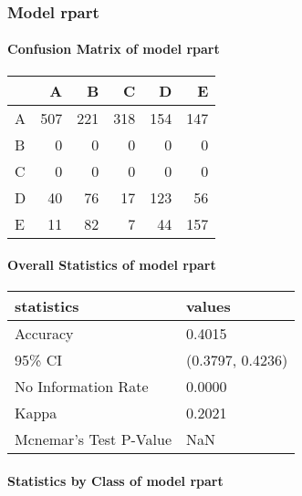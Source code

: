 \documentclass[]{article}
\let\oldparagraph\paragraph
\renewcommand{\paragraph}[1]{\oldparagraph{#1}\mbox{}}
\begin{document}
\subsubsection{Model rpart}\label{model-rpart}

\paragraph{Confusion Matrix of model
rpart}\label{confusion-matrix-of-model-rpart}

\begin{table}[H]
\centering
\begin{tabular}{l|r|r|r|r|r}
\hline
  & A & B & C & D & E\\
\hline
A & 507 & 221 & 318 & 154 & 147\\
\hline
B & 0 & 0 & 0 & 0 & 0\\
\hline
C & 0 & 0 & 0 & 0 & 0\\
\hline
D & 40 & 76 & 17 & 123 & 56\\
\hline
E & 11 & 82 & 7 & 44 & 157\\
\hline
\end{tabular}
\end{table}

\paragraph{Overall Statistics of model
rpart}\label{overall-statistics-of-model-rpart}

\begin{table}[H]
\centering
\begin{tabular}{l|l}
\hline
statistics & values\\
\hline
Accuracy & 0.4015\\
\hline
95\% CI & (0.3797, 0.4236)\\
\hline
No Information Rate & 0.0000\\
\hline
Kappa & 0.2021\\
\hline
Mcnemar's Test P-Value & NaN\\
\hline
\end{tabular}
\end{table}

\paragraph{Statistics by Class of model
rpart}\label{statistics-by-class-of-model-rpart}

\begingroup\fontsize{11}{13}\selectfont
\end{document}
